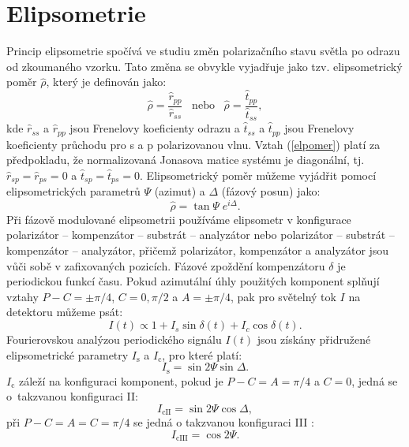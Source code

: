 \documentclass[12pt,oneside,final]{fithesis2}
\begin{document}
\section{Elipsometrie}
Princip elipsometrie spočívá ve studiu změn polarizačního stavu světla po odrazu od zkoumaného vzorku. Tato změna se obvykle vyjadřuje jako tzv. elipsometrický poměr $\hat{\rho}$, který je definován jako:
\begin{equation} \hat{\rho} = \frac{\hat{r}_{pp}}{\hat{r}_{ss}} \;\;\; \mathrm{nebo} \;\;\; \hat{\rho} = \frac{\hat{t}_{pp}}{\hat{t}_{ss}} \mathrm{,}\label{elpomer}\end{equation}
kde $\hat{r}_{ss}$ a $\hat{r}_{pp}$ jsou Frenelovy koeficienty odrazu a $\hat{t}_{ss}$ a $\hat{t}_{pp}$ jsou Frenelovy koeficienty průchodu pro s a p polarizovanou vlnu. Vztah (\ref{elpomer}) platí za předpokladu, že normalizovaná Jonasova matice systému je diagonální, tj. $\hat{r}_{sp} = \hat{r}_{ps} = 0$ a $\hat{t}_{sp} = \hat{t}_{ps} = 0$. Elipsometrický poměr můžeme vyjádřit pomocí elipsometrických parametrů $\Psi$ (azimut) a $\Delta$ (fázový posun) jako:
%
\begin{equation} \hat{\rho} = \tan{\Psi} \; e^{i\Delta} \mathrm{.}\end{equation}
%
Při fázově modulované elipsometrii používáme elipsometr v konfigurace polarizátor -- kompenzátor -- substrát -- analyzátor nebo polarizátor -- substrát -- kompenzátor -- analyzátor, přičemž polarizátor, kompenzátor a analyzátor jsou vůči sobě v zafixovaných pozicích. Fázové zpoždění kompenzátoru $\delta$ je periodickou funkcí času. Pokud azimutální úhly použitých komponent splňují vztahy $P - C = \pm \pi/4$, $C=0, \pi/2$ a $A = \pm \pi/4$, pak pro světelný tok $I$ na detektoru můžeme psát:
%
\begin{equation} I(t) \propto 1 + I_s \sin{\delta(t)} + I_c \cos{\delta(t)} \mathrm{.}\end{equation}
%
Fourierovskou analýzou periodického signálu $I(t)$ jsou získány přidružené elipsometrické parametry $I_\mathrm{s}$ a $I_{\mathrm{c}}$, pro které platí:
\begin{equation} I_\mathrm{s} = \sin{2\Psi} \sin{\Delta} \mathrm{.}\end{equation}
$I_{\mathrm{c}}$ záleží na konfiguraci komponent, pokud je $P - C = A = \pi/4$ a $ C = 0 $, jedná se o~takzvanou konfiguraci II:
\begin{equation} I_\mathrm{cII} = \sin{2\Psi} \cos{\Delta} \mathrm{,}\end{equation} 
při $P - C = A = C = \pi/4$ se jedná o takzvanou konfiguraci III \cite{ohlidal2000}:
\begin{equation} I_\mathrm{cIII} = \cos{2\Psi} \mathrm{.}\end{equation}
\end{document}
